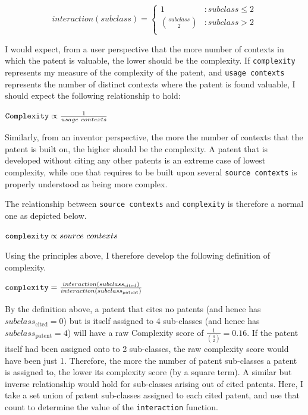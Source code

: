 \documentclass[12pt]{article}
\begin{document}
\begin{displaymath}
   interaction(subclass) = \left\{
     \begin{array}{lr}
       1 & : subclass \leq 2 \\
       \binom{subclass}{2} & : subclass > 2 \\
     \end{array}
   \right.
\end{displaymath} 

I would expect, from a user perspective that the more number of contexts in which the patent is valuable, the lower should be the complexity. If \verb|complexity| represents my measure of the complexity of the patent, and \verb|usage contexts| represents the number of distinct contexts where the patent is found valuable, I should expect the following relationship to hold:
\begin{center}$ \verb|Complexity| \propto \frac{1}{usage \ contexts} $ \end{center}
Similarly, from an inventor perspective, the more the number of contexts that the patent is built on, the higher should be the complexity. A patent that is developed without citing any other patents is an extreme case of lowest complexity, while one that requires to be built upon several \verb|source contexts| is properly understood as being more complex. 

The relationship between \verb|source contexts| and \verb|complexity| is therefore a normal one as depicted below.
\begin{center}$ \verb|complexity| \propto source \ contexts $ \end{center} 

Using the principles above, I therefore develop the following definition of complexity.
\begin{center}$ \verb|complexity| = \frac{interaction(subclass_{\text{cited}})}{interaction(subclass_{\text{patent}})} $ \end{center}

By the definition above, a patent that cites no patents (and hence has $subclass_{\text{cited}} = 0$) but is itself assigned to 4 sub-classes (and hence has $subclass_{\text{patent}} = 4$) will have a raw Complexity score of $\frac{1}{\binom{4}{2}} = 0.16$. If the patent itself had been assigned onto to 2 sub-classes, the raw complexity score would have been just 1. Therefore, the more the number of patent sub-classes a patent is assigned to, the lower its complexity score (by a square term). A similar but inverse relationship would hold for sub-classes arising out of cited patents. Here, I take a set union of patent sub-classes assigned to each cited patent, and use that count to determine the value of the \verb|interaction| function.
\end{document}
